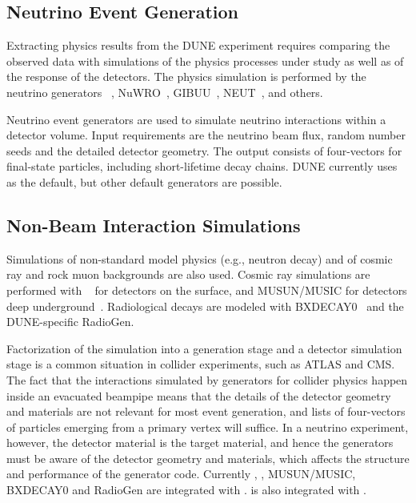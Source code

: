 \documentclass[../main-v1.tex]{subfiles}
\begin{document}
\subsection{Neutrino Event Generation}

Extracting physics results from the DUNE experiment requires comparing the observed data with simulations %
of the physics processes under study as well as of the response of the detectors.  The physics simulation is performed by the neutrino generators ~\cite{Andreopoulos:2009rq}, NuWRO~\cite{NuWro2012}, GIBUU~\cite{Gallmeister:2016dnq}, NEUT~\cite{Hayato:2009zz}, and others. 

Neutrino event generators are used to simulate neutrino interactions within a detector volume.  Input requirements are the neutrino beam flux, random number seeds and the detailed detector geometry. The output consists of four-vectors for final-state particles, including short-lifetime decay chains.  DUNE currently uses ~\cite{GENIE} as the default, but other default generators are possible. 

\subsection{Non-Beam Interaction Simulations}
Simulations of non-standard model physics (e.g., neutron decay) and of cosmic ray and rock muon backgrounds are also used.  Cosmic ray simulations are performed with ~\cite{Wentz:2003bp,Dembinski:2020wrp} for detectors on the surface, and MUSUN/MUSIC for detectors deep underground~\cite{Kudryavtsev:2008qh,LBNEDOCDB9673}.  Radiological decays are modeled with BXDECAY0~\cite{Ponkratenko:2000um} and the DUNE-specific RadioGen.

Factorization of the simulation into a generation stage and a detector simulation stage is a common situation  in collider experiments, such as ATLAS and CMS.  The fact that the interactions simulated by generators for collider physics happen inside an evacuated beampipe means that the details of the detector geometry and materials are not relevant for most event generation, and lists of four-vectors of particles emerging from a primary vertex will suffice.  In a neutrino experiment, however, the detector material is the target material, and hence the generators must be aware of the detector geometry and materials, which affects the structure and performance of the generator code.  Currently , , MUSUN/MUSIC, BXDECAY0 and RadioGen are integrated with .   is also integrated with .
\end{document}
